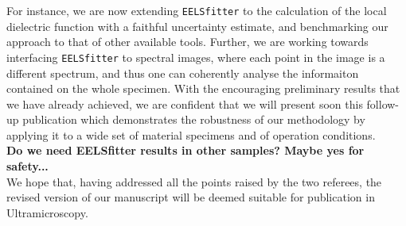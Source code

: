 \documentclass[12pt]{article}
\begin{document}
For instance, we are now extending {\tt EELSfitter} to the calculation of the local
dielectric function with a faithful uncertainty estimate, and benchmarking our approach
to that of other available tools.
%
Further, we are working towards interfacing {\tt EELSfitter}  to spectral images, where each
point in the image is a different spectrum, and thus one can coherently analyse
the informaiton contained on the whole specimen.
%
With the encouraging preliminary results that we have already achieved, we are confident
that we will present soon this follow-up publication which demonstrates the robustness
of our methodology by applying it to
a wide set of material specimens and of operation conditions.\\

{\bf Do we need EELSfitter results in other samples? Maybe yes for safety...}\\




We hope that, having addressed all the points raised by the two referees, the revised
version of our manuscript will be deemed suitable for publication in
Ultramicroscopy.
\end{document}
